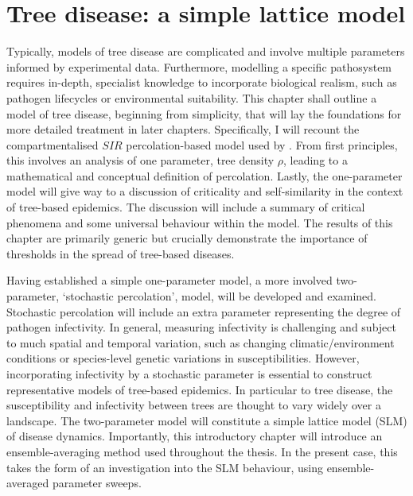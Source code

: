 
\chapter{Tree disease: a simple lattice model}
\label{chapter:SLM}
Typically, models of tree disease are complicated and involve multiple parameters informed by experimental data. Furthermore, modelling a specific pathosystem requires in-depth, specialist knowledge to incorporate biological realism, such as pathogen lifecycles or environmental suitability. This chapter shall outline a model of tree disease, beginning from simplicity, that will lay the foundations for more detailed treatment in later chapters. Specifically, I will recount the compartmentalised $SIR$ percolation-based model used by \cite{OROZCOFUENTES201912}. From first principles, this involves an analysis of one parameter, tree density $\rho$, leading to a mathematical and conceptual definition of percolation. Lastly, the one-parameter model will give way to a discussion of criticality and self-similarity in the context of tree-based epidemics. The discussion will include a summary of critical phenomena and some universal behaviour within the model.  The results of this chapter are primarily generic but crucially demonstrate the importance of thresholds in the spread of tree-based diseases.

Having established a simple one-parameter model, a more involved two-parameter, `stochastic percolation', model, will be developed and examined. Stochastic percolation will include an extra parameter representing the degree of pathogen infectivity. In general, measuring infectivity is challenging and subject to much spatial and temporal variation, such as changing climatic/environment conditions or species-level genetic variations in susceptibilities.  However, incorporating infectivity by a stochastic parameter is essential to construct representative models of tree-based epidemics. In particular to tree disease, the susceptibility and infectivity between trees are thought to vary widely over a landscape. The two-parameter model will constitute a simple lattice model (SLM) of disease dynamics. Importantly, this introductory chapter will introduce an ensemble-averaging method used throughout the thesis. In the present case, this takes the form of an investigation into the SLM behaviour, using ensemble-averaged parameter sweeps.

